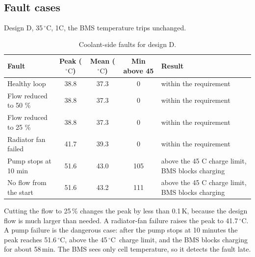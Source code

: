 \documentclass[11pt,a4paper]{article}
\newcommand{\degC}{\ensuremath{{}^{\circ}\mathrm{C}}}
\begin{document}
\subsection{Fault cases}
Design D, 35\,\degC, 1C, the BMS temperature trips unchanged.
\begin{table}[H]
\centering\scriptsize
\begin{tabular}{@{}p{3.3cm}cccp{4.6cm}@{}}
\toprule
Fault & Peak (\degC) & Mean (\degC) & Min above 45 & Result \\
\midrule
Healthy loop & 38.8 & 37.3 & 0 & within the requirement \\
Flow reduced to 50 \% & 38.8 & 37.3 & 0 & within the requirement \\
Flow reduced to 25 \% & 38.8 & 37.3 & 0 & within the requirement \\
Radiator fan failed & 41.7 & 39.3 & 0 & within the requirement \\
Pump stops at 10 min & 51.6 & 43.0 & 105 & above the 45 C charge limit, BMS blocks charging \\
No flow from the start & 51.6 & 43.2 & 111 & above the 45 C charge limit, BMS blocks charging \\
\bottomrule
\end{tabular}
\caption{Coolant-side faults for design D.}
\end{table}
Cutting the flow to 25\,\% changes the peak by less than 0.1\,K, because the design flow is much larger than needed. A radiator-fan failure raises the peak to 41.7\,\degC. A pump failure is the dangerous case: after the pump stops at 10 minutes the peak reaches 51.6\,\degC, above the 45\,\degC\ charge limit, and the BMS blocks charging for about 58\,min. The BMS sees only cell temperature, so it detects the fault late.
\end{document}
